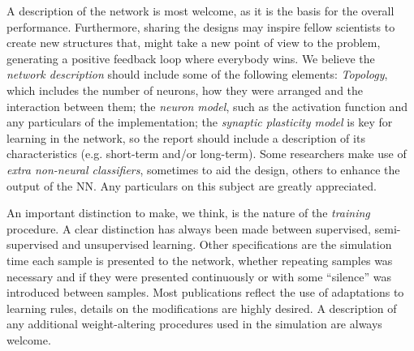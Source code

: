 A description of the network is most welcome, as it is the basis for the overall performance. Furthermore, sharing the designs may inspire fellow scientists to create new structures that, might take a new point of view to the problem, generating a positive feedback loop where everybody wins. We believe the \emph{network description} should include some of the following elements:
    \textit{Topology}, %
    which includes the number of neurons, how they were arranged and the interaction between them; 
    the \textit{neuron model}, %
    such as the activation function and any particulars of the implementation;
    the \textit{synaptic plasticity model} %
    is key for learning in the network, so the report should include a description of its characteristics (e.g. short-term and/or long-term).
      Some researchers make use of \emph{extra non-neural classifiers}, sometimes to aid the design, others to enhance the output of the NN. Any particulars on this subject are greatly appreciated.


An important distinction to make, we think, is the nature of the \emph{training} procedure. A clear distinction has always been made between supervised, semi-supervised and unsupervised learning. Other specifications are the simulation time each sample is presented to the network, whether repeating samples was necessary and if they were presented continuously or with some ``silence'' was introduced between samples. Most publications reflect the use of adaptations to learning rules, details on the modifications are highly desired. A description of any additional weight-altering procedures used in the simulation are always welcome.

